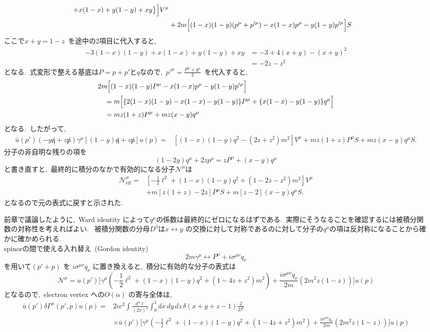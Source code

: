 \documentclass[uplatex,dvipdfmx,a4paper,11pt]{jsarticle}
\begin{document}
\begin{myproof}
\[\begin{aligned}
+x(1-x)+y(1-y)+xy
\bigr\}
\Bigr]V^\mu
\\
&+2m\Bigl[
(1-x)(1-y)(p^\mu + p'^\mu)
-x(1-x)p^\mu-y(1-y)p'^\mu
\Bigr]S
\end{aligned}
\]
ここで$x+y=1-z$~を途中の2項目に代入すると,~
\[
\begin{aligned}
-3(1-x)(1-y)+x(1-x)+y(1-y)+xy
&=-3+4(x+y)-(x+y)^2\\
&=-2z-z^2
\end{aligned}
\]
となる.~式変形で整える基底は$P=p+p'$と$q$なので,~$p'^\mu = \frac{P^\mu + q^\mu}{2}$~を代入すると,~
\[
\begin{aligned}
&2m\Bigl[
(1-x)(1-y)P^\mu
-x(1-x)p^\mu-y(1-y)p'^\mu
\Bigr]
\\
&\quad=
m\Bigl[
\{2(1-x)(1-y)-x(1-x)-y(1-y)\}P^\mu
+\{x(1-x)-y(1-y)\}q^\mu
\Bigr]
\\
&\quad=mz(1+z)P^\mu+mz(x-y)q^\mu
\end{aligned}
\]
となる.~したがって,~
\[
\begin{aligned}
\bar u(p')
(-y\not q+z\not p)\gamma^\mu
\left[(1-y)\not q+z\not p\right]u(p)={}&
\left[(1-x)(1-y)q^2-(2z+z^2)m^2\right]V^\mu +mz(1+z)P^\mu S
+mz(x-y)q^\mu S.
\end{aligned}
\]
分子の非自明な残りの項を
\[
(1-2y)q^\mu+2zp^\mu
=zP^\mu+(x-y)q^\mu
\]
と書き直すと,~最終的に積分のなかで有効的になる分子$\mathcal{N}^\mu$は
\[
\begin{aligned}
\mathcal N^\mu_{\mathrm{eff}}
={}&
\left[
-\frac12\ell^2
+(1-x)(1-y)q^2
+(1-2z-z^2)m^2
\right]V^\mu
\\
&+m\left[z(1+z)-2z\right]P^\mu S
+m\left[z-2\right](x-y)q^\mu S.
\end{aligned}
\]
となるので元の表式に戻すと示された.
\end{myproof}
前章で議論したように,~Ward identity によって$q^\mu$の係数は最終的にゼロになるはずである.~実際にそうなることを確認するには被積分関数の対称性を考えればよい.~
被積分関数の分母$D^3$は\(x\leftrightarrow y\) の交換に対して対称であるのに対して分子の$q^\mu$の項は反対称になることから確かに確かめられる.\\
spinorの間で使える入れ替え~(Gordon identity)
\[
2m\gamma^\mu \leftrightarrow P^\mu + i\sigma^{\mu\nu}q_\nu
\]
を用いて\((p'+p)\) を \(i\sigma^{\mu\nu}q_\nu\) に置き換えると,~積分に有効的な分子の表式は
\[
\mathcal{N}^\mu =u(p')
\Biggl[
\gamma^\mu
\left(
-\frac12\ell^2
+(1-x)(1-y)q^2
+(1-4z+z^2)m^2
\right)
+\frac{i\sigma^{\mu\nu}q_\nu}{2m}
\left(2m^2z(1-z)\right)
\Biggr]u(p)
\]
となるので,~electron vertex への\(O(\alpha)\) の寄与全体は,
\[
\begin{aligned}
\bar u(p')\delta\Gamma^\mu(p',p)u(p)
={}&2ie^2
\int\frac{d^4\ell}{(2\pi)^4}
\int_0^1 dx\,dy\,dz\,
\delta(x+y+z-1)\frac{2}{D^3}
\\
&\times\bar u(p')
\Biggl[
\gamma^\mu
\left(
-\frac12\ell^2
+(1-x)(1-y)q^2
+(1-4z+z^2)m^2
\right)
+\frac{i\sigma^{\mu\nu}q_\nu}{2m}
\left(2m^2z(1-z)\right)
\Biggr]u(p)
\end{aligned}
\]
\end{document}
